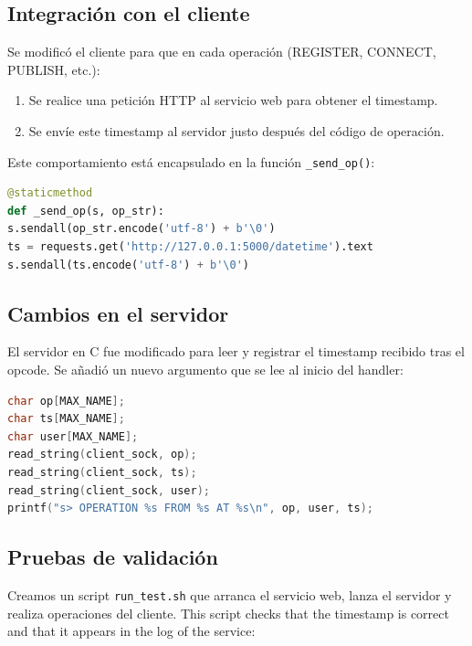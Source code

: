 \documentclass[12pt,a4paper]{article}
\begin{document}
\subsection{Integración con el cliente}

Se modificó el cliente para que en cada operación (REGISTER, CONNECT, PUBLISH, etc.):

\begin{enumerate}
\item Se realice una petición HTTP al servicio web para obtener el timestamp.
\item Se envíe este timestamp al servidor justo después del código de operación.
\end{enumerate}

Este comportamiento está encapsulado en la función \texttt{\_send\_op()}:

\begin{lstlisting}[language=Python,caption={Cliente: envío de operación con timestamp},label=lst:web2]
@staticmethod
def _send_op(s, op_str):
s.sendall(op_str.encode('utf-8') + b'\0')
ts = requests.get('http://127.0.0.1:5000/datetime').text
s.sendall(ts.encode('utf-8') + b'\0')
\end{lstlisting}

\subsection{Cambios en el servidor}

El servidor en C fue modificado para leer y registrar el timestamp recibido tras el opcode. Se añadió un nuevo argumento que se lee al inicio del handler:

\begin{lstlisting}[language=C,caption={Servidor: recepción del timestamp},label=lst:web3]
char op[MAX_NAME];
char ts[MAX_NAME];
char user[MAX_NAME];
read_string(client_sock, op);
read_string(client_sock, ts);
read_string(client_sock, user);
printf("s> OPERATION %s FROM %s AT %s\n", op, user, ts);
\end{lstlisting}

\subsection{Pruebas de validación}

Creamos un script \texttt{run_test.sh} que arranca el servicio web, lanza el servidor y realiza operaciones del cliente. This script checks that the timestamp is correct and that it appears in the log of the service:
\end{document}
